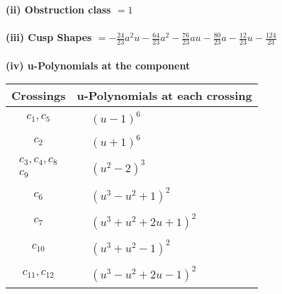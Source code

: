 \documentclass[1p]{elsarticle_modified}
\theoremstyle{definition}
\begin{document}
\flushleft \textbf{(ii) Obstruction class $= 1$}\\~\\
\flushleft \textbf{(iii) Cusp Shapes $= -\frac{24}{23} a^2 u-\frac{64}{23} a^2-\frac{76}{23} a u-\frac{80}{23} a-\frac{12}{23} u-\frac{124}{23}$}\\~\\
\newpage\renewcommand{\arraystretch}{1}
\flushleft \textbf{(iv) u-Polynomials at the component}\newline \\
\begin{tabular}{m{50pt}|m{274pt}}
Crossings & \hspace{64pt}u-Polynomials at each crossing \\
\hline $$\begin{aligned}c_{1},c_{5}\end{aligned}$$&$\begin{aligned}
&(u-1)^6
\end{aligned}$\\
\hline $$\begin{aligned}c_{2}\end{aligned}$$&$\begin{aligned}
&(u+1)^6
\end{aligned}$\\
\hline $$\begin{aligned}c_{3},c_{4},c_{8}\\c_{9}\end{aligned}$$&$\begin{aligned}
&(u^2-2)^3
\end{aligned}$\\
\hline $$\begin{aligned}c_{6}\end{aligned}$$&$\begin{aligned}
&(u^3- u^2+1)^2
\end{aligned}$\\
\hline $$\begin{aligned}c_{7}\end{aligned}$$&$\begin{aligned}
&(u^3+u^2+2 u+1)^2
\end{aligned}$\\
\hline $$\begin{aligned}c_{10}\end{aligned}$$&$\begin{aligned}
&(u^3+u^2-1)^2
\end{aligned}$\\
\hline $$\begin{aligned}c_{11},c_{12}\end{aligned}$$&$\begin{aligned}
&(u^3- u^2+2 u-1)^2
\end{aligned}$\\
\hline
\end{tabular}\\~\\
\end{document}
